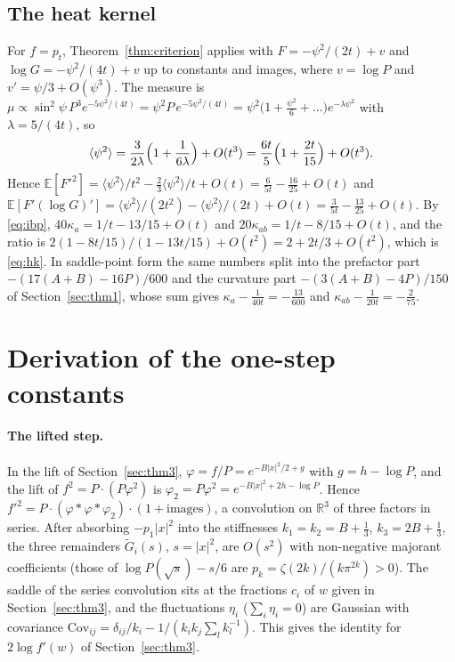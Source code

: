 \documentclass[11pt,a4paper]{article}
\theoremstyle{definition}
\theoremstyle{remark}
\newcommand{\E}{\mathbb{E}}
\newcommand{\R}{\mathbb{R}}
\begin{document}
\subsection{The heat kernel}\label{app:hk}
For $f=p_t$, Theorem~\ref{thm:criterion} applies with $F=-\psi^2/(2t)+v$ and $\log G=-\psi^2/(4t)+v$ up to constants and images, where $v=\log P$ and $v'=\psi/3+O(\psi^3)$.
The measure is $\mu\propto\sin^2\psi\,P^3e^{-5\psi^2/(4t)}=\psi^2P\,e^{-5\psi^2/(4t)}=\psi^2\bigl(1+\tfrac{\psi^2}6+\dots\bigr)e^{-\lambda\psi^2}$ with $\lambda=5/(4t)$, so
\[
\langle\psi^2\rangle=\frac3{2\lambda}\Bigl(1+\frac1{6\lambda}\Bigr)+O(t^3)=\frac{6t}5\Bigl(1+\frac{2t}{15}\Bigr)+O(t^3).
\]
Hence $\E[F'^2]=\langle\psi^2\rangle/t^2-\tfrac23\langle\psi^2\rangle/t+O(t)=\tfrac6{5t}-\tfrac{16}{25}+O(t)$ and $\E[F'(\log G)']=\langle\psi^2\rangle/(2t^2)-\langle\psi^2\rangle/(2t)+O(t)=\tfrac3{5t}-\tfrac{13}{25}+O(t)$.
By \eqref{eq:ibp}, $40\kappa_a=1/t-13/15+O(t)$ and $20\kappa_{ab}=1/t-8/15+O(t)$, and the ratio is $2(1-8t/15)/(1-13t/15)+O(t^2)=2+2t/3+O(t^2)$, which is \eqref{eq:hk}.
In saddle-point form the same numbers split into the prefactor part $-(17(A+B)-16P)/600$ and the curvature part $-(3(A+B)-4P)/150$ of Section~\ref{sec:thm1}, whose sum gives $\kappa_a-\tfrac1{40t}=-\tfrac{13}{600}$ and $\kappa_{ab}-\tfrac1{20t}=-\tfrac2{75}$.

\section{Derivation of the one-step constants}\label{app:const}

\paragraph{The lifted step.}
In the lift of Section~\ref{sec:thm3}, $\varphi=f/P=e^{-B|x|^2/2+g}$ with $g=h-\log P$, and the lift of $f^2=P\cdot(P\varphi^2)$ is $\varphi_2=P\varphi^2=e^{-B|x|^2+2h-\log P}$.
Hence $f'^2=P\cdot(\varphi*\varphi*\varphi_2)\cdot(1+\text{images})$, a convolution on $\R^3$ of three factors in series.
After absorbing $-p_1|x|^2$ into the stiffnesses $k_1=k_2=B+\tfrac13$, $k_3=2B+\tfrac13$, the three remainders $\tilde G_i(s)$, $s=|x|^2$, are $O(s^2)$ with non-negative majorant coefficients (those of $\log P(\sqrt s)-s/6$ are $p_k=\zeta(2k)/(k\pi^{2k})>0$).
The saddle of the series convolution sits at the fractions $c_i$ of $w$ given in Section~\ref{sec:thm3}, and the fluctuations $\eta_i$ ($\sum_i\eta_i=0$) are Gaussian with covariance $\mathrm{Cov}_{ij}=\delta_{ij}/k_i-1/(k_ik_j\sum_lk_l^{-1})$.
This gives the identity for $2\log f'(w)$ of Section~\ref{sec:thm3}.
\end{document}
